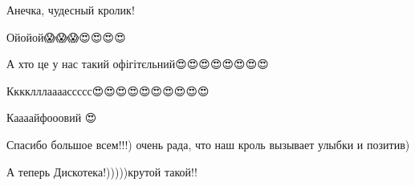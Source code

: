 
Анечка, чудесный кролик!


Ойойой😱😱😱😍😍😍😍

А хто це у нас такий офігітєльний😍😍😍😍😍😍😍😍

Кккклллаааассссс😍😍😍😍😍😍😍😍😍😍


Каааайфооовий 😍🙏


Спасибо большое всем!!!) очень рада, что наш кроль вызывает улыбки и позитив)


А теперь Дискотека!)))))крутой такой!!
